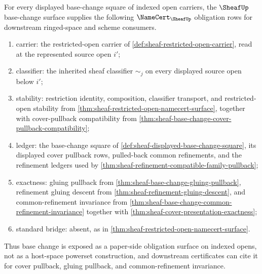 \begin{theorem}
\label{thm:sheaf-base-change-namecert-obligation-surface}
For every displayed base-change square of indexed open carriers, the $\SheafUp$ base-change surface supplies the following $\NameCert_{\SheafUp}$ obligation rows for downstream ringed-space and scheme consumers.
\begin{enumerate}
\item carrier: the restricted-open carrier of \autoref{def:sheaf-restricted-open-carrier}, read at the represented source open $i'$;
\item classifier: the inherited sheaf classifier $\sim_j$ on every displayed source open below $i'$;
\item stability: restriction identity, composition, classifier transport, and restricted-open stability from \autoref{thm:sheaf-restricted-open-namecert-surface}, together with cover-pullback compatibility from \autoref{thm:sheaf-base-change-cover-pullback-compatibility};
\item ledger: the base-change square of \autoref{def:sheaf-displayed-base-change-square}, its displayed cover pullback rows, pulled-back common refinements, and the refinement ledgers used by \autoref{thm:sheaf-refinement-compatible-family-pullback};
\item exactness: gluing pullback from \autoref{thm:sheaf-base-change-gluing-pullback}, refinement gluing descent from \autoref{thm:sheaf-refinement-gluing-descent}, and common-refinement invariance from \autoref{thm:sheaf-base-change-common-refinement-invariance} together with \autoref{thm:sheaf-cover-presentation-exactness};
\item standard bridge: absent, as in \autoref{thm:sheaf-restricted-open-namecert-surface}.
\end{enumerate}
Thus base change is exposed as a paper-side obligation surface on indexed opens, not as a host-space powerset construction, and downstream certificates can cite it for cover pullback, gluing pullback, and common-refinement invariance.
\end{theorem}
